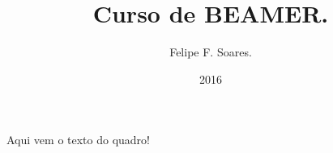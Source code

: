 \documentclass{beamer}
\title{Curso de BEAMER.}
\author{Felipe F. Soares.}
\institute{Universidade Federal do Cear\'a \\ soaresfelipef@gmail.com}
\date{2016}
\begin{document}
	\begin{frame}
		\titlepage
	\end{frame}
	
	\begin{frame}
		Aqui vem o texto do quadro!
	\end{frame}
\end{document}
